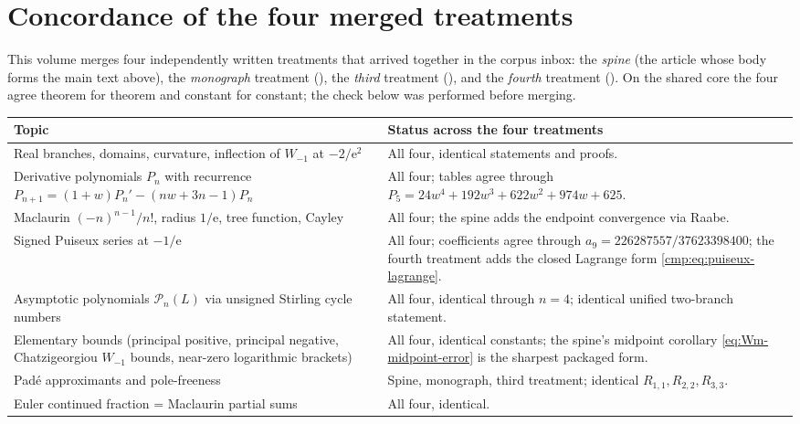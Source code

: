 \documentclass[11pt]{article}
\theoremstyle{remark}
\newcommand{\Wm}{W_{-1}}
\newcommand{\ee}{\mathrm e}
\begin{document}
\section{Concordance of the four merged treatments}\label{app:concordance}

This volume merges four independently written treatments that arrived
together in the corpus inbox: the \emph{spine} (the article whose body forms
the main text above), the \emph{monograph} treatment
(), the \emph{third} treatment
(), and the \emph{fourth} treatment
().  On the shared core the four agree
theorem for theorem and constant for constant; the check below was performed
before merging.

\begin{longtable}{@{}p{}p{}@{}}
\toprule
Topic & Status across the four treatments\\
\midrule
\endhead
Real branches, domains, curvature, inflection of \(\Wm\) at \(-2/\ee^2\) &
All four, identical statements and proofs.\\
\addlinespace
Derivative polynomials \(P_n\) with recurrence
\(P_{n+1}=(1+w)P_n'-(nw+3n-1)P_n\) &
All four; tables agree through \(P_5=24w^4+192w^3+622w^2+974w+625\).\\
\addlinespace
Maclaurin \((-n)^{n-1}/n!\), radius \(1/\ee\), tree function, Cayley &
All four; the spine adds the endpoint convergence via Raabe.\\
\addlinespace
Signed Puiseux series at \(-1/\ee\) &
All four; coefficients agree through \(a_9=226287557/37623398400\);
the fourth treatment adds the closed Lagrange form
\eqref{cmp:eq:puiseux-lagrange}.\\
\addlinespace
Asymptotic polynomials \(\mathcal P_n(L)\) via unsigned Stirling cycle
numbers &
All four, identical through \(n=4\); identical unified two-branch
statement.\\
\addlinespace
Elementary bounds (principal positive, principal negative, Chatzigeorgiou
\(\Wm\) bounds, near-zero logarithmic brackets) &
All four, identical constants; the spine's midpoint corollary
\eqref{eq:Wm-midpoint-error} is the sharpest packaged form.\\
\addlinespace
Pad\'e approximants and pole-freeness &
Spine, monograph, third treatment; identical
\(R_{1,1},R_{2,2},R_{3,3}\).\\
\addlinespace
Euler continued fraction = Maclaurin partial sums &
All four, identical.\\

\end{longtable}
\end{document}
